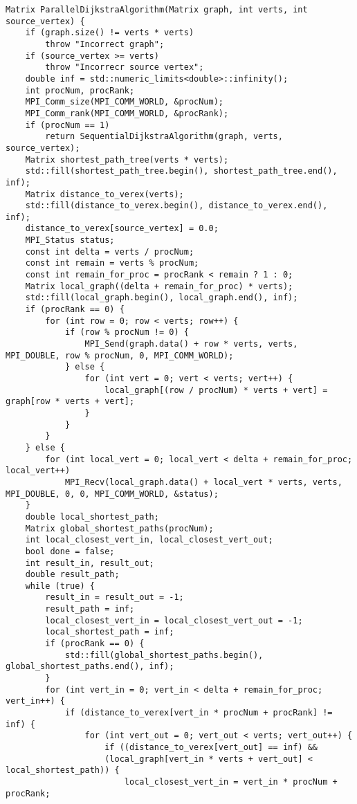 \documentclass{report}
\begin{document}
\begin{lstlisting}
Matrix ParallelDijkstraAlgorithm(Matrix graph, int verts, int source_vertex) {
    if (graph.size() != verts * verts)
        throw "Incorrect graph";
    if (source_vertex >= verts)
        throw "Incorrecr source vertex";
    double inf = std::numeric_limits<double>::infinity();
    int procNum, procRank;
    MPI_Comm_size(MPI_COMM_WORLD, &procNum);
    MPI_Comm_rank(MPI_COMM_WORLD, &procRank);
    if (procNum == 1)
        return SequentialDijkstraAlgorithm(graph, verts, source_vertex);
    Matrix shortest_path_tree(verts * verts);
    std::fill(shortest_path_tree.begin(), shortest_path_tree.end(), inf);
    Matrix distance_to_verex(verts);
    std::fill(distance_to_verex.begin(), distance_to_verex.end(), inf);
    distance_to_verex[source_vertex] = 0.0;
    MPI_Status status;
    const int delta = verts / procNum;
    const int remain = verts % procNum;
    const int remain_for_proc = procRank < remain ? 1 : 0;
    Matrix local_graph((delta + remain_for_proc) * verts);
    std::fill(local_graph.begin(), local_graph.end(), inf);
    if (procRank == 0) {
        for (int row = 0; row < verts; row++) {
            if (row % procNum != 0) {
                MPI_Send(graph.data() + row * verts, verts, MPI_DOUBLE, row % procNum, 0, MPI_COMM_WORLD);
            } else {
                for (int vert = 0; vert < verts; vert++) {
                    local_graph[(row / procNum) * verts + vert] = graph[row * verts + vert];
                }
            }
        }
    } else {
        for (int local_vert = 0; local_vert < delta + remain_for_proc; local_vert++)
            MPI_Recv(local_graph.data() + local_vert * verts, verts, MPI_DOUBLE, 0, 0, MPI_COMM_WORLD, &status);
    }
    double local_shortest_path;
    Matrix global_shortest_paths(procNum);
    int local_closest_vert_in, local_closest_vert_out;
    bool done = false;
    int result_in, result_out;
    double result_path;
    while (true) {
        result_in = result_out = -1;
        result_path = inf;
        local_closest_vert_in = local_closest_vert_out = -1;
        local_shortest_path = inf;
        if (procRank == 0) {
            std::fill(global_shortest_paths.begin(), global_shortest_paths.end(), inf);
        }
        for (int vert_in = 0; vert_in < delta + remain_for_proc; vert_in++) {
            if (distance_to_verex[vert_in * procNum + procRank] != inf) {
                for (int vert_out = 0; vert_out < verts; vert_out++) {
                    if ((distance_to_verex[vert_out] == inf) &&
                    (local_graph[vert_in * verts + vert_out] < local_shortest_path)) {
                        local_closest_vert_in = vert_in * procNum + procRank;

\end{lstlisting}
\end{document}
